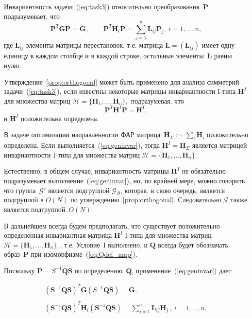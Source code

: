 {
Инвариантность задачи~(\ref{eq:task3}) относительно преобразования~$\textbf{P}$ подразумевает, что
%
\begin{equation}
\label{eq:geninvar}
\textbf{P}^T\textbf{GP}=\textbf{G} \,  , \qquad \textbf{P}^T\textbf{H}_i \textbf{P} = \sum_{j=1}^n \textbf{L}_{ij}\textbf{P}_j , \  i=1,\dots,n,
\end{equation}
%
где $ \textbf{L}_{ij} $ элементы матрицы перестановок, т.е. матрица ${\textbf{L}=(\textbf{L}_{ij})}$ имеет одну единицу в каждом столбце и в каждой строке, остальные элементы~$\textbf{L}$ равны нулю.

Утверждение~\ref{prop:orthogonal} может быть применено для анализа симметрий задачи~(\ref{eq:task3}), если известны некоторые матрицы инвариантности I-типа $\textbf{H}^I$ для множества матриц ${\mathcal{H}}=\{\textbf{H}_1,\dots,\textbf{H}_n\},$ подразумевая, что
%
\begin{equation}
\label{eq:invBS}
\textbf{P}^T \textbf{H}^I \textbf{P} = \textbf{H}^I,
\end{equation}
и { $\textbf{H}^I$ } положительна определена.

В задаче оптимизации направленности ФАР матрица~$\textbf{H}_{\Sigma}:=\sum_i \textbf{H}_i$ положительно определена. Если выполняется~(\ref{eq:geninvar}), тогда $\textbf{H}^I=\textbf{H}_{\Sigma}$ является матрицей инвариантности I-типа для множества матриц ${\mathcal{H}}=\{\textbf{H}_1,\dots,\textbf{H}_n\}.$

Естественно, в общем случае, инвариантность матрицы $\textbf{H}^I$ не обязательно подразумевает выполнение~(\ref{eq:geninvar}), но, по крайней мере, можно говорить, что группа~$\mathcal G'$ является подгруппой ${\mathcal G}_{\mathcal{B}}$, которая, в свою очередь, является подгруппой в $O(N)$ по утверждению~\ref{prop:orthogonal}. Следовательно $\mathcal{G}$ также является подгруппой~$O(N)$.


В дальнейшем всегда будем предполагать, что существует положительно определенная инвариантная матрица $\textbf{H}^I$ I-типа для множества матриц ${\mathcal{H}}=\{\textbf{H}_1,\dots,\textbf{H}_n\},$, т.е. Условие~I выполнено, и $\textbf{Q}$ всегда будет обозначать образ~$\textbf{P}$ при изоморфизме~(\ref{eq:Qdef_map}).

Поскольку $\textbf{P}=S^{-1}\textbf{QS}$ по определению~$\textbf{Q}$, применение~(\ref{eq:geninvar}) дает

%
\begin{equation}
\begin{array}{l}
\displaystyle
(\textbf{S}^{-1}\textbf{QS})^T\textbf{G}(S^{-1}\textbf{QS})=\textbf{G} \,  , \\ \\
\displaystyle
(\textbf{S}^{-1}\textbf{QS})^T\textbf{H}_i (\textbf{S}^{-1}\textbf{QS})= \sum_{j=1}^n \textbf{L}_{ij}\textbf{H}_j \, , \ i=1,\dots,n,
\end{array}
\end{equation}
%

}
